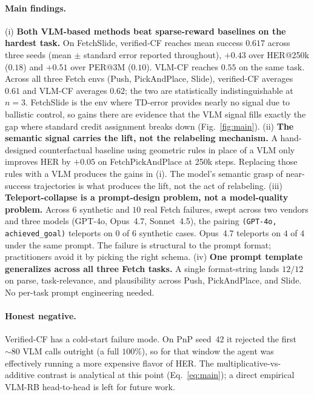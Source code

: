 \documentclass{article}
\begin{document}
\paragraph{Main findings.}
(i) \textbf{Both VLM-based methods beat sparse-reward baselines on the
hardest task.} On FetchSlide, verified-CF reaches mean success $0.617$
across three seeds (mean $\pm$ standard error reported throughout),
$+0.43$ over HER@250k ($0.18$) and $+0.51$ over PER@3M ($0.10$). VLM-CF
reaches $0.55$ on the same task. Across all three Fetch envs (Push,
PickAndPlace, Slide), verified-CF averages $0.61$ and VLM-CF averages
$0.62$; the two are statistically indistinguishable at $n\!=\!3$.
FetchSlide is the env where TD-error provides nearly no signal due to
ballistic control, so gains there are evidence that the VLM signal
fills exactly the gap where standard credit assignment breaks down
(Fig.~\ref{fig:main}).
(ii) \textbf{The semantic signal carries the lift, not the
relabeling mechanism.} A hand-designed counterfactual baseline using
geometric rules in place of a VLM only improves HER by $+0.05$ on
FetchPickAndPlace at 250k steps. Replacing those rules with a VLM
produces the gains in (i). The model's semantic grasp of near-success
trajectories is what produces the lift, not the act of relabeling.
(iii) \textbf{Teleport-collapse is a prompt-design problem, not a
model-quality problem.} Across $6$ synthetic and $10$ real Fetch
failures, swept across two vendors and three models (GPT-4o, Opus~4.7,
Sonnet~4.5), the pairing \texttt{(GPT-4o, achieved\_goal)} teleports
on $0$ of $6$ synthetic cases. Opus~4.7 teleports on $4$ of $4$ under
the same prompt. The failure is structural to the prompt format;
practitioners avoid it by picking the right schema.
(iv) \textbf{One prompt template generalizes across all three Fetch
tasks.} A single format-string lands $12/12$ on parse, task-relevance,
and plausibility across Push, PickAndPlace, and Slide. No
per-task prompt engineering needed.

\paragraph{Honest negative.}
Verified-CF has a cold-start failure mode. On PnP seed~42 it
rejected the first ${\sim}80$ VLM calls outright (a full $100\%$),
so for that window the agent was effectively running a more
expensive flavor of HER. The multiplicative-vs-additive contrast is
analytical at this point (Eq.~\ref{eq:main}); a direct empirical
VLM-RB head-to-head is left for future work.
\end{document}
